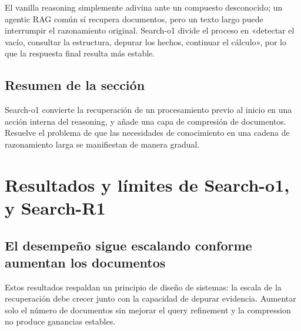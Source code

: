 \documentclass[a4paper]{article}
\begin{document}
El vanilla reasoning simplemente adivina ante un compuesto desconocido; un agentic RAG común sí recupera documentos, pero un texto largo puede interrumpir el razonamiento original. Search-o1 divide el proceso en «detectar el vacío, consultar la estructura, depurar los hechos, continuar el cálculo», por lo que la respuesta final resulta más estable.

\subsection{Resumen de la sección}

Search-o1 convierte la recuperación de un procesamiento previo al inicio en una acción interna del reasoning, y añade una capa de compresión de documentos. Resuelve el problema de que las necesidades de conocimiento en una cadena de razonamiento larga se manifiestan de manera gradual.
\section{Resultados y límites de Search-o1, y Search-R1}

\subsection{El desempeño sigue escalando conforme aumentan los documentos}





Estos resultados respaldan un principio de diseño de sistemas: la escala de la recuperación debe crecer junto con la capacidad de depurar evidencia. Aumentar solo el número de documentos sin mejorar el query refinement y la compression no produce ganancias estables.
\end{document}
